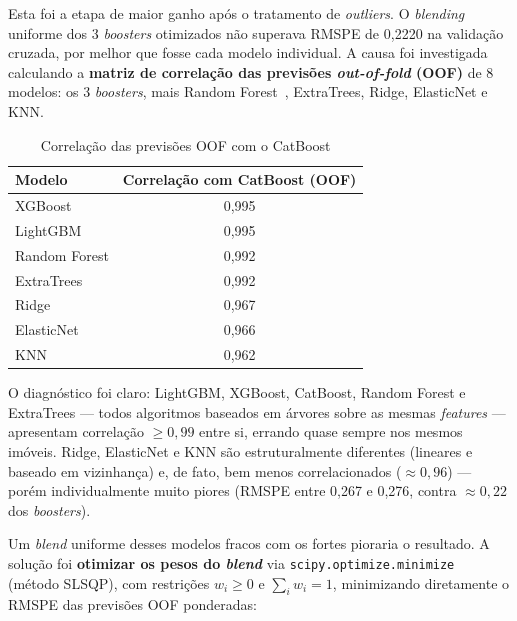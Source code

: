 \documentclass[12pt, a4paper]{article}
\newcommand{\code}[1]{\texttt{#1}}
\begin{document}
Esta foi a etapa de maior ganho após o tratamento de \textit{outliers}. O \textit{blending} uniforme dos 3 \textit{boosters} otimizados não superava RMSPE de 0,2220 na validação cruzada, por melhor que fosse cada modelo individual. A causa foi investigada calculando a \textbf{matriz de correlação das previsões \textit{out-of-fold} (OOF)} de 8 modelos: os 3 \textit{boosters}, mais Random Forest~\cite{ref:breiman}, ExtraTrees, Ridge, ElasticNet e KNN.

\begin{table}[H]
  \centering
  \caption{Correlação das previsões OOF com o CatBoost}
  \label{tab:correlacao}
  \small{}
  \begin{tabular}{lc}
    \toprule
    \rowcolor{headerblue}
    \color{white}\textbf{Modelo} & \color{white}\textbf{Correlação com CatBoost (OOF)} \\
    \midrule
    XGBoost                & 0,995 \\
    LightGBM               & 0,995 \\
    Random Forest          & 0,992 \\
    ExtraTrees             & 0,992 \\
    Ridge                  & 0,967 \\
    ElasticNet             & 0,966 \\
    KNN                    & 0,962 \\
    \bottomrule
  \end{tabular}
\end{table}

O diagnóstico foi claro: LightGBM, XGBoost, CatBoost, Random Forest e ExtraTrees --- todos algoritmos baseados em árvores sobre as mesmas \textit{features} --- apresentam correlação $\geq 0{,}99$ entre si, errando quase sempre nos mesmos imóveis. Ridge, ElasticNet e KNN são estruturalmente diferentes (lineares e baseado em vizinhança) e, de fato, bem menos correlacionados ($\approx 0{,}96$) --- porém individualmente muito piores (RMSPE entre 0,267 e 0,276, contra $\approx 0{,}22$ dos \textit{boosters}).

Um \textit{blend} uniforme desses modelos fracos com os fortes pioraria o resultado. A solução foi \textbf{otimizar os pesos do \textit{blend}} via \code{scipy.optimize.minimize}~\cite{ref:scipy} (método SLSQP), com restrições $w_i \geq 0$ e $\sum_i w_i = 1$, minimizando diretamente o RMSPE das previsões OOF ponderadas:
\end{document}
